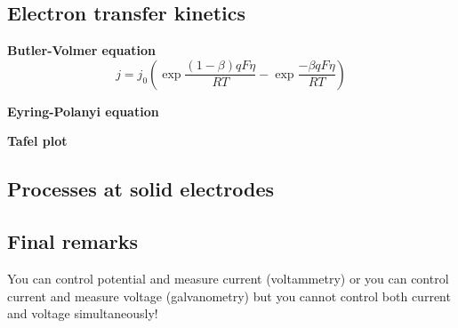 \subsection*{Electron transfer kinetics}

\textbf{Butler-Volmer equation}
\begin{equation*}
    j = j_0 \left( \exp \frac{(1 - \beta)qF\eta}{RT} - \exp \frac{-\beta q F \eta}{RT} \right)
\end{equation*}

\textbf{Eyring-Polanyi equation}

\textbf{Tafel plot}

\subsection*{Processes at solid electrodes}


\subsection*{Final remarks}
You can control potential and measure current (voltammetry) or you can control current
and measure voltage (galvanometry) but you cannot control both current and voltage
simultaneously!

